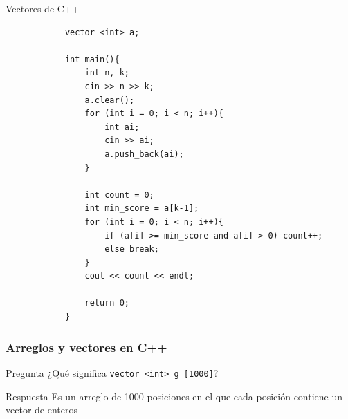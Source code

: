 \documentclass{beamer}
\begin{document}
\begin{section}{Vectores de C++}
\begin{frame}[fragile]
\begin{lstlisting}
			vector <int> a;

			int main(){
			    int n, k;
			    cin >> n >> k;
			    a.clear();
			    for (int i = 0; i < n; i++){
			        int ai;
			        cin >> ai;
			        a.push_back(ai); 
			    }

			    int count = 0;
			    int min_score = a[k-1];
			    for (int i = 0; i < n; i++){
			        if (a[i] >= min_score and a[i] > 0) count++;
			        else break;
			    }
			    cout << count << endl;
			    
				return 0;
			}
		\end{lstlisting}		
	\end{frame}
	
	\begin{frame}[fragile]
		\frametitle{Arreglos y vectores en C++}
		\begin{alertblock}{Pregunta}
			¿Qué significa \verb|vector <int> g [1000]|? 
		\end{alertblock}\pause
		\begin{exampleblock}{Respuesta}
			Es un arreglo de 1000 posiciones en el que cada posición contiene un vector de enteros
		\end{exampleblock}
	\end{frame}	
\end{section}
\end{document}
